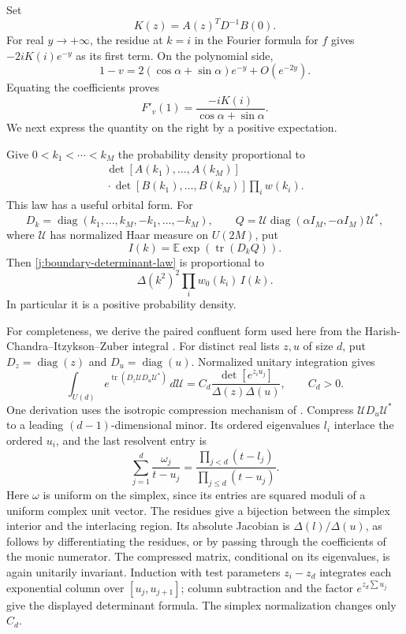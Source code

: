Set
\[
 K(z)=A(z)^TD^{-1}B(0).
\]
For real $y\to+\infty$, the residue at $k=i$ in the Fourier formula for
$f$ gives $-2iK(i)e^{-y}$ as its first term. On the polynomial side,
\[
 1-v=2(\cos\alpha+\sin\alpha)e^{-y}+O(e^{-2y}).
\]
Equating the coefficients proves
\begin{equation}\label{j:boundary-residue}
 F'_v(1)=\frac{-iK(i)}{\cos\alpha+\sin\alpha}.
\end{equation}
We next express the quantity on the right by a positive expectation.

Give $0<k_1<\cdots<k_M$ the probability density proportional to
\begin{equation}\label{j:boundary-determinant-law}
 \begin{gathered}
 \det[A(k_1),\ldots,A(k_M)]\\
 {}\cdot\det[B(k_1),\ldots,B(k_M)]\prod_iw(k_i).
 \end{gathered}
\end{equation}
This law has a useful orbital form. For
\[
 D_k=\operatorname{diag}(k_1,\ldots,k_M,-k_1,\ldots,-k_M),
 \qquad
 Q=\mathcal U\operatorname{diag}(\alpha I_M,-\alpha I_M)\mathcal U^*,
\]
where $\mathcal U$ has normalized Haar measure on $U(2M)$, put
\[
 I(k)=\mathbb E\exp(\operatorname{tr}(D_kQ)).
\]
Then \eqref{j:boundary-determinant-law} is proportional to
\begin{equation}\label{j:boundary-orbital-law}
 \Delta(k^2)^2\prod_iw_0(k_i)\,I(k).
\end{equation}
In particular it is a positive probability density.

For completeness, we derive the paired confluent form used here from the
Harish-Chandra--Itzykson--Zuber integral
\cite[Section~2, (2.1)]{ZinnJustinZuber2003}. For distinct real lists
$z,u$ of size $d$, put $D_z=\operatorname{diag}(z)$ and
$D_u=\operatorname{diag}(u)$. Normalized unitary integration gives
\[
 \int_{U(d)}e^{\operatorname{tr}(D_z\mathcal U D_u\mathcal U^*)}\,d\mathcal U
 =C_d\frac{\det[e^{z_i u_j}]}{\Delta(z)\Delta(u)},
 \qquad C_d>0.
\]
One derivation uses the isotropic compression mechanism of
\cite[Section~4]{Baryshnikov2001}. Compress $\mathcal U D_u\mathcal U^*$ to a leading
$(d-1)$-dimensional minor. Its ordered eigenvalues $l_i$ interlace the
ordered $u_i$, and the last resolvent entry is
\[
 \sum_{j=1}^d\frac{\omega_j}{t-u_j}
 =\frac{\prod_{j<d}(t-l_j)}{\prod_{j\le d}(t-u_j)}.
\]
Here $\omega$ is uniform on the simplex, since its entries are squared
moduli of a uniform complex unit vector. The residues give a bijection
between the simplex interior and the interlacing region. Its absolute
Jacobian is $\Delta(l)/\Delta(u)$, as follows by differentiating the
residues, or by passing through the coefficients of the monic numerator.
The compressed matrix, conditional on its eigenvalues, is again
unitarily invariant. Induction with test parameters $z_i-z_d$ integrates
each exponential column over $[u_j,u_{j+1}]$; column subtraction and the
factor $e^{z_d\sum u_j}$ give the displayed determinant formula. The
simplex normalization changes only $C_d$.

